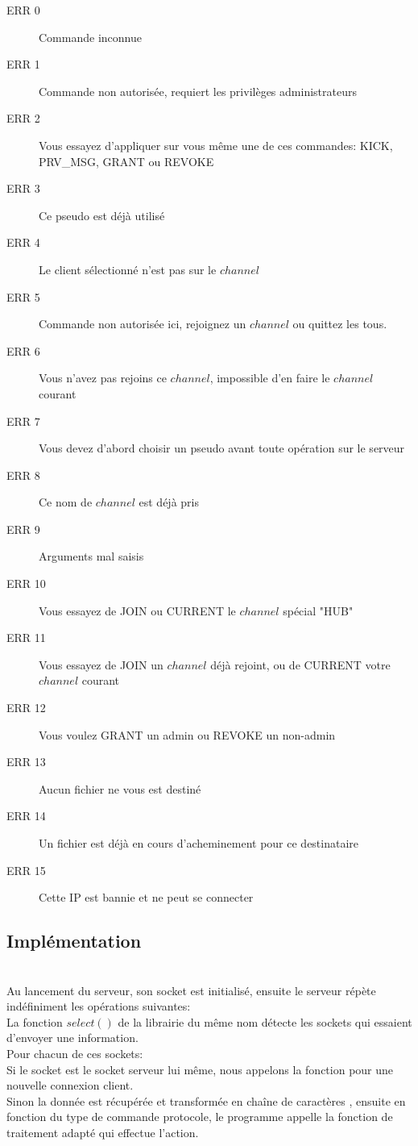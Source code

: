 \documentclass[12pt]{article}
\begin{document}
\begin{description}
    \item[ERR 0] Commande inconnue
    \item[ERR 1] Commande non autorisée, requiert les privilèges administrateurs
    \item[ERR 2] Vous essayez d'appliquer sur vous même une de ces commandes: KICK, PRV\_MSG, GRANT ou REVOKE
    \item[ERR 3] Ce pseudo est déjà utilisé
    \item[ERR 4] Le client sélectionné n'est pas sur le $channel$
    \item[ERR 5] Commande non autorisée ici, rejoignez un $channel$ ou quittez les tous. 
    \item[ERR 6] Vous n'avez pas rejoins ce $channel$, impossible d'en faire le $channel$ courant
    \item[ERR 7] Vous devez d'abord choisir un pseudo avant toute opération sur le serveur
    \item[ERR 8] Ce nom de $channel$ est déjà pris
    \item[ERR 9] Arguments mal saisis
    \item[ERR 10] Vous essayez de JOIN ou CURRENT le $channel$ spécial "HUB"
    \item[ERR 11] Vous essayez de JOIN un $channel$ déjà rejoint, ou de CURRENT votre $channel$ courant
    \item[ERR 12] Vous voulez GRANT un admin ou REVOKE un non-admin
    \item[ERR 13] Aucun fichier ne vous est destiné
    \item[ERR 14] Un fichier est déjà en cours d'acheminement pour ce destinataire
    \item[ERR 15] Cette IP est bannie et ne peut se connecter
\end{description}


\subsection{Implémentation}
\\Au lancement du serveur, son socket est initialisé, ensuite le serveur répète indéfiniment
les opérations suivantes:
\\La fonction $select()$ de la librairie du même nom détecte les sockets qui essaient d'envoyer
une information.
\\Pour chacun de ces sockets:
\\Si le socket est le socket serveur lui même, nous appelons la fonction pour une nouvelle connexion client.
\\Sinon la donnée est récupérée et transformée en chaîne de caractères
, ensuite en fonction du type de commande protocole, le programme appelle la fonction
de traitement adapté qui effectue l'action.
\\
\end{document}
